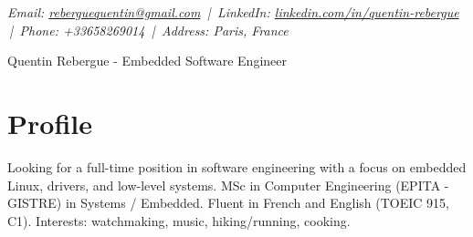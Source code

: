 \documentclass[9pt,a4paper]{article}
\newcommand{\namefont}{\fontsize{18}{22}\selectfont}
\newcommand{\tinyscript}{\fontsize{8}{8}\selectfont}
\begin{document}
\renewcommand\normalsize{\fontsize{10.5}{15}\selectfont}
\normalsize

\begin{center}
  {\tinyscript\itshape
  Email: \href{mailto:reberguequentin@gmail.com}{reberguequentin@gmail.com} \,|\,
  LinkedIn: \href{https://linkedin.com/in/quentin-rebergue}{linkedin.com/in/quentin-rebergue} \,|\,
  Phone: +33658269014 \,|\,
  Address: Paris, France}
\end{center}

\begin{center}
  {\namefont Quentin Rebergue - Embedded Software Engineer}
\end{center}

\section*{Profile}
\begin{tcolorbox}[mybox2]
Looking for a full-time position in software engineering with a focus on embedded Linux, drivers, and low-level systems. MSc in Computer Engineering (EPITA - GISTRE) in Systems / Embedded. Fluent in French and English (TOEIC 915, C1). Interests: watchmaking, music, hiking/running, cooking.
\end{tcolorbox}
\end{document}
